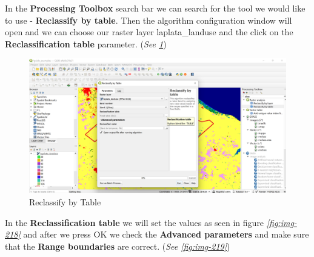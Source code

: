 \documentclass[
]{book}
\begin{document}
In the \textbf{Processing Toolbox} search bar we can search for the tool we would like to use - \textbf{Reclassify by table}. Then the algorithm configuration window will open and we can choose our raster layer {laplata\_landuse} and the click on the \textbf{Reclassification table} parameter. (\emph{See \ref{fig:img-217}})

\begin{figure}

{\centering \includegraphics[width=1\linewidth]{images/reclass} 

}

\caption{Reclassify by Table}\label{fig:img-217}
\end{figure}

In the \textbf{Reclassification table} we will set the values as seen in figure \emph{\ref{fig:img-218}} and after we press OK we check the \textbf{Advanced parameters} and make sure that the \textbf{Range boundaries} are correct. (\emph{See \ref{fig:img-219}})
\end{document}
